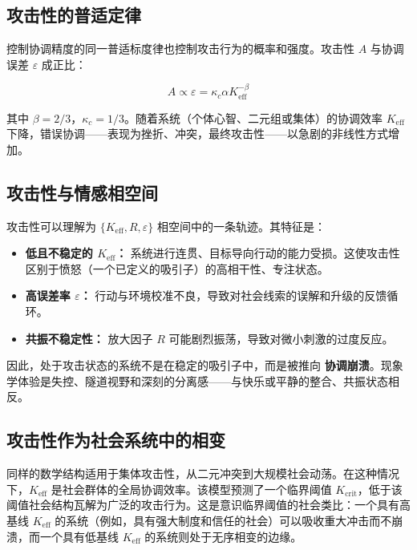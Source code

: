 \documentclass[12pt,a4paper]{article}
\begin{document}
		\subsection{攻击性的普适定律}
		
		控制协调精度的同一普适标度律也控制攻击行为的概率和强度。攻击性 $A$ 与协调误差 $\varepsilon$ 成正比：
		
		\begin{equation}
		A \propto \varepsilon = \kappa_c \alpha K_{\mathrm{eff}}^{-\beta}
		\end{equation}
		
		其中 $\beta = 2/3$，$\kappa_c = 1/3$。随着系统（个体心智、二元组或集体）的协调效率 $K_{\mathrm{eff}}$ 下降，错误协调——表现为挫折、冲突，最终攻击性——以急剧的非线性方式增加。
		
		\subsection{攻击性与情感相空间}
		
		攻击性可以理解为 $\{K_{\mathrm{eff}}, R, \varepsilon\}$ 相空间中的一条轨迹。其特征是：
		
		\begin{itemize}
		\item \textbf{低且不稳定的 $K_{\mathrm{eff}}$：} 系统进行连贯、目标导向行动的能力受损。这使攻击性区别于愤怒（一个已定义的吸引子）的高相干性、专注状态。
		\item \textbf{高误差率 $\varepsilon$：} 行动与环境校准不良，导致对社会线索的误解和升级的反馈循环。
		\item \textbf{共振不稳定性：} 放大因子 $R$ 可能剧烈振荡，导致对微小刺激的过度反应。
		\end{itemize}
		
		因此，处于攻击状态的系统不是在稳定的吸引子中，而是被推向 \textbf{协调崩溃}。现象学体验是失控、隧道视野和深刻的分离感——与快乐或平静的整合、共振状态相反。
		
		\subsection{攻击性作为社会系统中的相变}
		
		同样的数学结构适用于集体攻击性，从二元冲突到大规模社会动荡。在这种情况下，$K_{\mathrm{eff}}$ 是社会群体的全局协调效率。该模型预测了一个临界阈值 $K_{\mathrm{crit}}$，低于该阈值社会结构瓦解为广泛的攻击行为。这是意识临界阈值的社会类比：一个具有高基线 $K_{\mathrm{eff}}$ 的系统（例如，具有强大制度和信任的社会）可以吸收重大冲击而不崩溃，而一个具有低基线 $K_{\mathrm{eff}}$ 的系统则处于无序相变的边缘。
		
\end{document}
